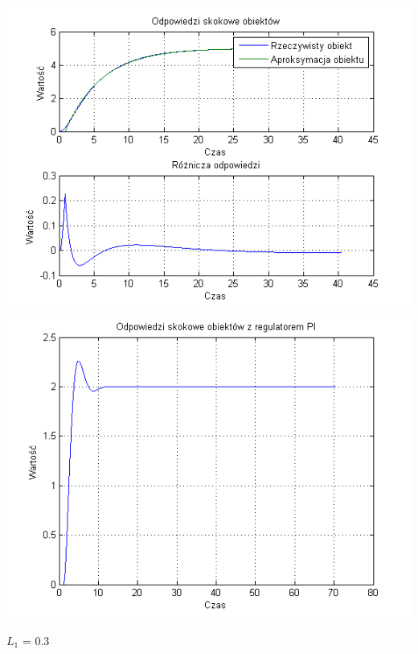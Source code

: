 \documentclass[10pt,a4paper]{article}
\begin{document}
\begin{center}
\includegraphics[scale=1]{images/jeden/skrypt_195.png}\\
\includegraphics[scale=1]{images/jeden/skrypt_196.png}\\
\end{center}
\newpage
$L_1$ = 0.3
\end{document}
